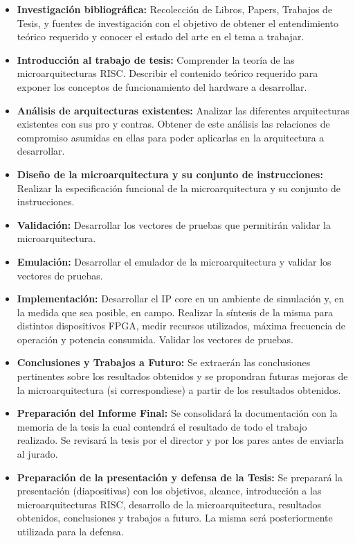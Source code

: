 \documentclass[a4paper]{article}
\begin{document}
\begin{itemize}
    \item \textbf{Investigación bibliográfica:} Recolección de Libros, Papers, Trabajos de Tesis, y fuentes de investigación con el objetivo de obtener el entendimiento teórico requerido y conocer el estado del arte en el tema a trabajar.
    \item \textbf{Introducción al trabajo de tesis:} Comprender la teoría de las microarquitecturas RISC. Describir el contenido teórico requerido para exponer los conceptos de funcionamiento del hardware a desarrollar.
    \item \textbf{Análisis de arquitecturas existentes:} Analizar las diferentes arquitecturas existentes con sus pro y contras. Obtener de este análisis las relaciones de compromiso asumidas en ellas para poder aplicarlas en la arquitectura a desarrollar.
    \item \textbf{Diseño de la microarquitectura y su conjunto de instrucciones:} Realizar la especificación funcional de la microarquitectura y su conjunto de instrucciones.
    \item \textbf{Validación:} Desarrollar los vectores de pruebas que permitirán validar la microarquitectura.
    \item \textbf{Emulación:} Desarrollar el emulador de la microarquitectura y validar los vectores de pruebas.
    \item \textbf{Implementación:} Desarrollar el IP core en un ambiente de simulación y, en la medida que sea posible, en campo. Realizar la síntesis de la misma para distintos dispositivos FPGA, medir recursos utilizados, máxima frecuencia de operación y potencia consumida. Validar los vectores de pruebas.
    \item \textbf{Conclusiones y Trabajos a Futuro:} Se extraerán las conclusiones pertinentes sobre los resultados obtenidos y se propondran futuras mejoras de la microarquitectura (si correspondiese) a partir de los resultados obtenidos.
    \item \textbf{Preparación del Informe Final:} Se consolidará la documentación con la memoria de la tesis la cual contendrá el resultado de todo el trabajo realizado. Se revisará la tesis por el director y por los pares antes de enviarla al jurado.
    \item \textbf{Preparación de la presentación y defensa de la Tesis:} Se preparará la presentación (diapositivas) con los objetivos, alcance, introducción a las microarquitecturas RISC, desarrollo de la microarquitectura, resultados obtenidos, conclusiones y trabajos a futuro. La misma será posteriormente utilizada para la defensa.
\end{itemize}
\end{document}
